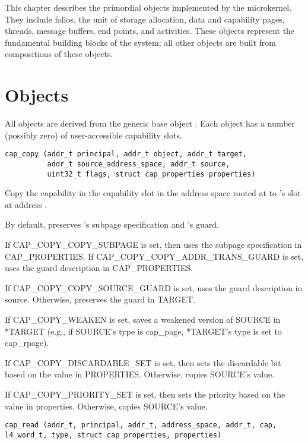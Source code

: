 This chapter describes the primordial objects implemented by the
microkernel.  They include folios, the unit of storage allocation,
data and capability pages, threads, message buffers, end points, and
activities.  These objects represent the fundamental building blocks
of the system; all other objects are built from compositions of these
objects.

\clearpage
\section{Objects}

All objects are derived from the generic base object .
Each object has a number (possibly zero) of user-accessible capability
slots.

\begin{lstlisting}
cap_copy (addr_t principal, addr_t object, addr_t target,
          addr_t source_address_space, addr_t source,
          uint32_t flags, struct cap_properties properties)
\end{lstlisting}

Copy the capability in the capability slot  in the address
space rooted at  to 's slot at
address .

By default, preserves 's subpage specification and
's guard.

If CAP\_COPY\_COPY\_SUBPAGE is set, then uses the subpage
specification in CAP\_PROPERTIES.  If CAP\_COPY\_COPY\_ADDR\_TRANS\_GUARD
is set, uses the guard description in CAP\_PROPERTIES.

If CAP\_COPY\_COPY\_SOURCE\_GUARD is set, uses the guard description in
source.  Otherwise, preserves the guard in TARGET.

If CAP\_COPY\_WEAKEN is set, saves a weakened version of SOURCE in
*TARGET (e.g., if SOURCE's type is cap\_page, *TARGET's type is set
to cap\_rpage).

If CAP\_COPY\_DISCARDABLE\_SET is set, then sets the discardable bit
based on the value in PROPERTIES.  Otherwise, copies SOURCE's
value.

If CAP\_COPY\_PRIORITY\_SET is set, then sets the priority based on
the value in properties.  Otherwise, copies SOURCE's value.


\begin{lstlisting}
cap_read (addr_t, principal, addr_t, address_space, addr_t, cap,
l4_word_t, type, struct cap_properties, properties)
\end{lstlisting}

